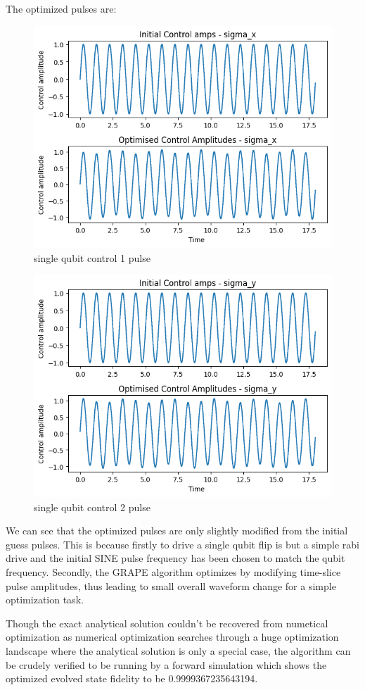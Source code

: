 \documentclass[12pt]{report}
\begin{document}
The optimized pulses are: 
\begin{figure}[H]
    \centering
    \includegraphics[width=0.95\linewidth]{single_qubit_control1.png}
    \caption{single qubit control 1 pulse}
    \label{fig:single_qubit_control1}
\end{figure}
\begin{figure}[H]
    \centering
    \includegraphics[width=0.95\linewidth]{single_qubit_control2.png}
    \caption{single qubit control 2 pulse}
    \label{fig:single_qubit_control2}
\end{figure}

We can see that the optimized pulses are only slightly modified from the initial guess pulses. 
This is because firstly to drive a single qubit flip is but a simple rabi drive and the initial SINE pulse frequency has been chosen to match the qubit frequency. 
Secondly, the GRAPE algorithm optimizes by modifying time-slice pulse amplitudes, thus leading to small overall waveform change for a simple optimization task.
\par
Though the exact analytical solution couldn't be recovered from numetical optimization as numerical optimization searches through a huge optimization landscape where the analytical solution is only a special case, 
the algorithm can be crudely verified to be running by a forward simulation which shows the optimized evolved state fidelity to be 0.9999367235643194. 
\end{document}
